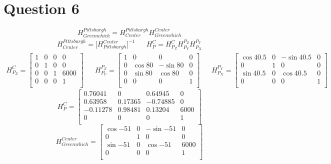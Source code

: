 \documentclass[11pt]{article}
\begin{document}
\section{Question 6}
$$
H^{Pittsburgh}_{Greenwhich} = 
H_{Center}^{Pittsburgh} H^{Center}_{Greenwhich} 
$$
\begin{align*}
H_{Center}^{Pittsburgh}=
\big[H^{Center}_{Pittsburgh}\big]^{-1} &&
H_{P}^C = 
H_{P_Z}^C
H^{P_Z}_{P_Y}
H^{P_Y}_{P_X}
\end{align*}
\begin{align*}
H_{P_Z}^C = 
\begin{bmatrix}
    1 & 0 & 0 & 0 \\
    0 & 1 & 0 & 0 \\
    0 & 0 & 1 & 6000 \\
    0 & 0 & 0 & 1 \\
\end{bmatrix}
&&
H^{P_Z}_{P_Y} =
\begin{bmatrix}
    1 & 0 & 0 & 0 \\
    0 & \cos{80} & -\sin{80} & 0 \\
    0 & \sin{80} &\cos{80} & 0 \\
    0 & 0 & 0 & 1 \\
\end{bmatrix}
&&
H^{P_Y}_{P_X} =
\begin{bmatrix}
    \cos{40.5} & 0 & -\sin{40.5} & 0 \\
    0&  1 & 0 & 0 \\
    \sin{40.5} &0&\cos{40.5} & 0 \\
    0& 0 & 0 & 1 \\
\end{bmatrix}
\end{align*}
$$
H_{P}^C = 
\begin{bmatrix}
     0.76041 &       0  &  0.64945  &     0   \\
     0.63958 & 0.17365  & -0.74885  &     0   \\
    -0.11278 & 0.98481  &  0.13204  &  6000   \\
       0     &   0      &    0      & 1       \\
\end{bmatrix}
$$
$$
H^{Center}_{Greenwhich} =
\begin{bmatrix}
    \cos{-51} & 0 & -\sin{-51} & 0 \\
    0&  1 & 0 & 0 \\
    \sin{-51} &0&\cos{-51} & 6000 \\
    0& 0 & 0 & 1 \\
\end{bmatrix}
$$
\end{document}
